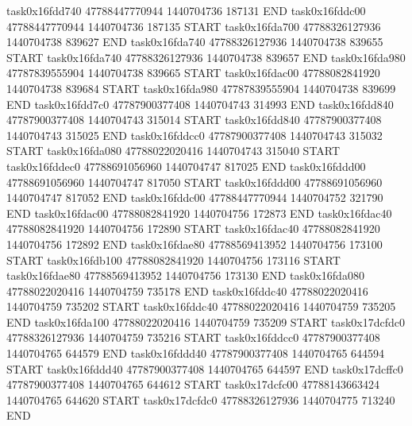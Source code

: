 task0x16fdd740 47788447770944          1440704736               187131  END
task0x16fddc00 47788447770944          1440704736               187135  START
task0x16fda700 47788326127936          1440704738               839627  END
task0x16fda740 47788326127936          1440704738               839655  START
task0x16fda740 47788326127936          1440704738               839657  END
task0x16fda980 47787839555904          1440704738               839665  START
task0x16fdac00 47788082841920          1440704738               839684  START
task0x16fda980 47787839555904          1440704738               839699  END
task0x16fdd7c0 47787900377408          1440704743               314993  END
task0x16fdd840 47787900377408          1440704743               315014  START
task0x16fdd840 47787900377408          1440704743               315025  END
task0x16fddcc0 47787900377408          1440704743               315032  START
task0x16fda080 47788022020416          1440704743               315040  START
task0x16fddec0 47788691056960          1440704747               817025  END
task0x16fddd00 47788691056960          1440704747               817050  START
task0x16fddd00 47788691056960          1440704747               817052  END
task0x16fddc00 47788447770944          1440704752               321790  END
task0x16fdac00 47788082841920          1440704756               172873  END
task0x16fdac40 47788082841920          1440704756               172890  START
task0x16fdac40 47788082841920          1440704756               172892  END
task0x16fdae80 47788569413952          1440704756               173100  START
task0x16fdb100 47788082841920          1440704756               173116  START
task0x16fdae80 47788569413952          1440704756               173130  END
task0x16fda080 47788022020416          1440704759               735178  END
task0x16fddc40 47788022020416          1440704759               735202  START
task0x16fddc40 47788022020416          1440704759               735205  END
task0x16fda100 47788022020416          1440704759               735209  START
task0x17dcfdc0 47788326127936          1440704759               735216  START
task0x16fddcc0 47787900377408          1440704765               644579  END
task0x16fddd40 47787900377408          1440704765               644594  START
task0x16fddd40 47787900377408          1440704765               644597  END
task0x17dcffc0 47787900377408          1440704765               644612  START
task0x17dcfc00 47788143663424          1440704765               644620  START
task0x17dcfdc0 47788326127936          1440704775               713240  END
